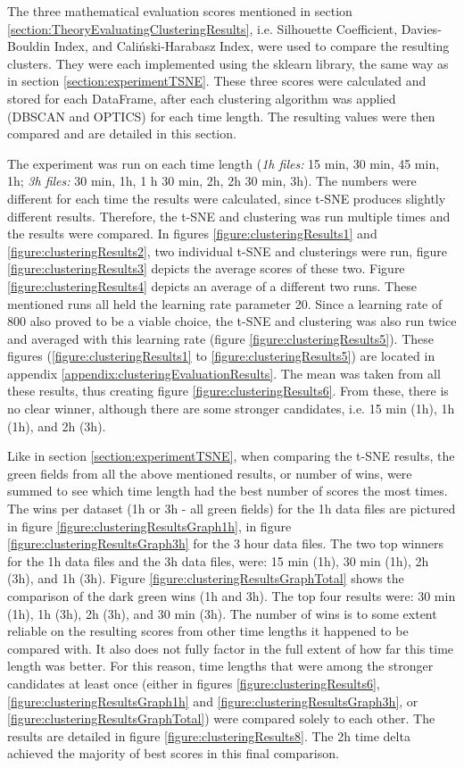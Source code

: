 
The three mathematical evaluation scores mentioned in section \ref{section:TheoryEvaluatingClusteringResults}, i.e. Silhouette Coefficient, Davies-Bouldin Index, and Caliński-Harabasz Index, were used to compare the resulting clusters.  They were each implemented using the sklearn library, the same way as in section \ref{section:experimentTSNE}. These three scores were calculated and stored for each DataFrame, after each clustering algorithm was applied (DBSCAN and OPTICS) for each time length. The resulting values were then compared and are detailed in this section.

The experiment was run on each time length (\textit{1h files:} 15 min, 30 min, 45 min, 1h; \textit{3h files:} 30 min, 1h, 1 h 30 min, 2h, 2h 30 min, 3h).
The numbers were different for each time the results were calculated, since t-SNE produces slightly different results. Therefore, the t-SNE and clustering was run multiple times and the results were compared. In figures \ref{figure:clusteringResults1} and \ref{figure:clusteringResults2}, two individual t-SNE and clusterings were run, figure \ref{figure:clusteringResults3} depicts the average scores of these two. Figure \ref{figure:clusteringResults4} depicts an average of a different two runs. These mentioned runs all held the learning rate parameter 20. Since a learning rate of 800 also proved to be a viable choice, the t-SNE and clustering was also run twice and averaged with this learning rate (figure \ref{figure:clusteringResults5}). These figures (\ref{figure:clusteringResults1} to \ref{figure:clusteringResults5}) are located in appendix \ref{appendix:clusteringEvaluationResults}. The mean was taken from all these results, thus creating figure \ref{figure:clusteringResults6}. From these, there is no clear winner, although there are some stronger candidates, i.e. 15 min (1h), 1h (1h), and 2h (3h). 

Like in section \ref{section:experimentTSNE}, when comparing the t-SNE results, the green fields from all the above mentioned results, or number of wins, were summed to see which time length had the best number of scores the most times. The wins per dataset (1h or 3h - all green fields) for the 1h data files are pictured in figure \ref{figure:clusteringResultsGraph1h}, in figure \ref{figure:clusteringResultsGraph3h} for the 3 hour data files. The two top winners for the 1h data files and the 3h data files, were: 15 min (1h), 30 min (1h), 2h (3h), and 1h (3h). Figure \ref{figure:clusteringResultsGraphTotal} shows the comparison of the dark green wins (1h and 3h). The top four results were: 30 min (1h), 1h (3h), 2h (3h), and 30 min (3h). The number of wins is to some extent reliable on the resulting scores from other time lengths it happened to be compared with. It also does not fully factor in the full extent of how far this time length was better. For this reason, time lengths that were among the stronger candidates at least once (either in figures \ref{figure:clusteringResults6}, \ref{figure:clusteringResultsGraph1h} and \ref{figure:clusteringResultsGraph3h}, or \ref{figure:clusteringResultsGraphTotal}) were compared solely to each other. The results are detailed in figure \ref{figure:clusteringResults8}. The 2h time delta achieved the majority of best scores in this final comparison. 

